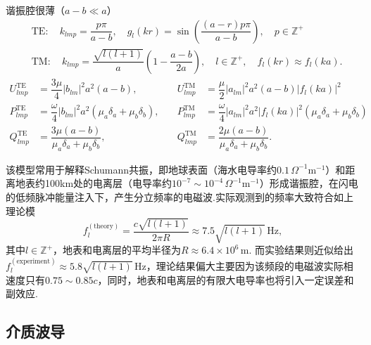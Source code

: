 \begin{example}
	谐振腔很薄（\(a - b \ll a\)）
	\begin{equation*}
		\begin{aligned}
			 & \text{TE}:\quad k_{lmp} = \dfrac{p\pi}{a - b},\quad g_l(kr) = \sin\left( \dfrac{(a - r)p\pi}{a - b} \right),\quad p \in \mathbb{Z}^+          \\
			 & \text{TM}:\quad k_{lmp} = \dfrac{\sqrt{l(l+1)}}{a} \left( 1 - \dfrac{a - b}{2a} \right),\quad l\in \mathbb{Z^+},\quad f_l(kr)\approx f_l(ka).
		\end{aligned}
	\end{equation*}
	\begin{equation*}
		\begin{aligned}
			U_{lmp}^{\text{TE}} & = \dfrac{3\mu}{4} |b_{lm}|^2 a^2 (a - b),\quad                             & U_{lmp}^{\text{TM}} & = \dfrac{\mu}{2} |a_{lm}|^2 a^2 (a - b) |f_l(ka)|^2                              \\
			P_{lmp}^{\text{TE}} & = \dfrac{\omega}{4} |b_{lm}|^2 a^2 (\mu_a \delta_a + \mu_b \delta_b),\quad & P_{lmp}^{\text{TM}} & = \dfrac{\omega}{4} |a_{lm}|^2 a^2 |f_l(ka)|^2 (\mu_a \delta_a + \mu_b \delta_b) \\
			Q_{lmp}^{\text{TE}} & = \dfrac{3\mu (a - b)}{\mu_a \delta_a + \mu_b \delta_b},\quad              & Q_{lmp}^{\text{TM}} & = \dfrac{2\mu (a - b)}{\mu_a \delta_a + \mu_b \delta_b}.
		\end{aligned}
	\end{equation*}

	该模型常用于解释Schumann共振，即地球表面（海水电导率约\(0.1 \, \Omega^{-1}\text{m}^{-1}\)）和距离地表约100km处的电离层（电导率约\(10^{-7} \sim 10^{-4} \, \Omega^{-1}\text{m}^{-1}\)）形成谐振腔，在闪电的低频脉冲能量注入下，产生分立频率的电磁波.实际观测到的频率大致符合如上理论模
	\begin{equation*}
		f_l^{(\text{theory})} = \dfrac{c \sqrt{l(l+1)}}{2\pi R} \approx 7.5 \sqrt{l(l+1)} \, \text{Hz},
	\end{equation*}
	其中\(l \in \mathbb{Z}^+\)，地表和电离层的平均半径为\(R \approx 6.4 \times 10^6 \, \text{m}\).
	而实验结果则近似给出\(f_l^{(\text{experiment})} \approx 5.8 \sqrt{l(l+1)} \, \text{Hz}\)，理论结果偏大主要因为该频段的电磁波实际相速度只有\(0.75 \sim 0.85c\)，同时，地表和电离层的有限大电导率也将引入一定误差和副效应.
\end{example}

\subsection{介质波导}
